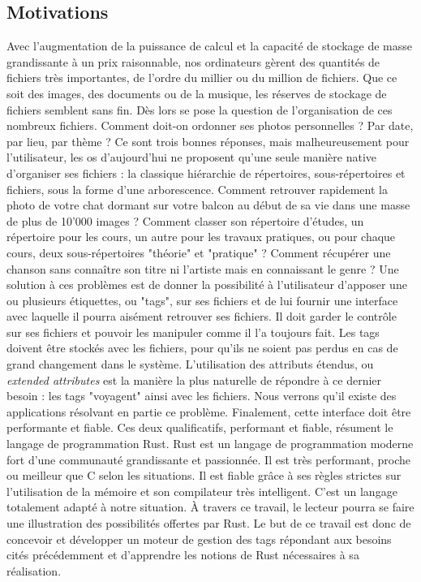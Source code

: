 \subsection{Motivations}
Avec l'augmentation de la puissance de calcul et la capacité de stockage de masse grandissante à un 
prix raisonnable, nos ordinateurs gèrent des quantités de fichiers très importantes, de l'ordre du 
millier ou du million de fichiers. Que ce soit des images, des documents ou de la musique, les 
réserves de stockage de fichiers semblent sans fin. Dès lors se pose la question de l'organisation 
de ces nombreux fichiers. Comment doit-on ordonner ses photos personnelles ? Par date, par lieu, 
par thème ? Ce sont trois bonnes réponses, mais malheureusement pour l'utilisateur, les \acrshort{os} 
d'aujourd'hui ne proposent qu'une seule manière native d'organiser ses fichiers : 
la classique hiérarchie de répertoires, sous-répertoires et fichiers, sous la forme d'une arborescence.
\bigbreak
Comment retrouver rapidement la photo de votre chat dormant sur votre balcon au début de sa vie 
dans une masse de plus de 10'000 images ? Comment classer son répertoire d'études, un répertoire 
pour les cours, un autre pour les travaux pratiques, ou pour chaque cours, deux sous-répertoires 
"théorie" et "pratique" ? Comment récupérer une chanson sans connaître son titre ni l'artiste mais 
en connaissant le genre ? Une solution à ces problèmes est de donner la possibilité à l'utilisateur 
d'apposer une ou plusieurs étiquettes, ou "tags", sur ses fichiers et de lui fournir une interface 
avec laquelle il pourra aisément retrouver ses fichiers. Il doit garder le contrôle sur ses fichiers 
et pouvoir les manipuler comme il l'a toujours fait. Les tags doivent être stockés avec les fichiers, 
pour qu'ils ne soient pas perdus en cas de grand changement dans le système. L'utilisation des 
attributs étendus, ou \textit{extended attributes} est la manière la plus naturelle de répondre à 
ce dernier besoin : les tags "voyagent" ainsi avec les fichiers. Nous verrons qu'il existe 
des applications résolvant en partie ce problème. Finalement, cette interface doit être performante et fiable. 
\bigbreak
Ces deux qualificatifs, performant et fiable, résument le langage de programmation Rust. Rust est 
un langage de programmation moderne fort d'une communauté grandissante et passionnée. Il est très 
performant, proche ou meilleur que C selon les situations. Il est fiable grâce à ses règles strictes 
sur l'utilisation de la mémoire et son compilateur très intelligent. C'est un langage totalement 
adapté à notre situation. À travers ce travail, le lecteur pourra se faire une illustration des 
possibilités offertes par Rust.
\bigbreak
Le but de ce travail est donc de concevoir et développer un moteur de gestion des tags répondant 
aux besoins cités précédemment et d'apprendre les notions de Rust nécessaires à sa réalisation.
\newpage
